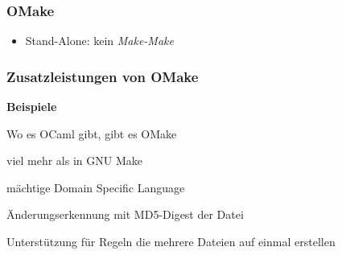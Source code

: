 \begin{frame}
	\frametitle{OMake}
	\begin{itemize}
		\item Stand-Alone: kein \emph{Make-Make}
	\end{itemize}
\end{frame}

\begin{frame}
	\frametitle{Zusatzleistungen von OMake}
	\textbf{Beispiele}
	\begin{description}[Abhängigkeitsanalyse]
		\item[Portabilität] Wo es OCaml gibt, gibt es OMake
		\item[implizite Regeln] viel mehr als in GNU Make
		\item[Programmierbarkeit] mächtige Domain Specific Language
		\item[Abhängigkeitsanalyse] Änderungserkennung mit MD5-Digest der Datei
		\item[Fortschrittsanzeige] 
		\item[Multi-File Regeln] Unterstützung für Regeln die mehrere Dateien auf einmal erstellen
	\end{description}
\end{frame}

